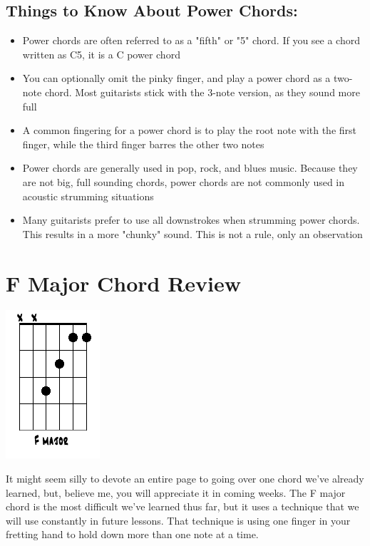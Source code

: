 \subsection{Things to Know About Power Chords:}
\begin{itemize}
\item Power chords are often referred to as a "fifth" or "5" chord. If you see
      a chord written as C5, it is a C power chord
\item You can optionally omit the pinky finger, and play a power chord as a
      two-note chord. Most guitarists stick with the 3-note version, as they sound
      more full
\item A common fingering for a power chord is to play the root note with the
      first finger, while the third finger barres the other two notes
\item Power chords are generally used in pop, rock, and blues music. Because
      they are not big, full sounding chords, power chords are not commonly used in
      acoustic strumming situations
\item Many guitarists prefer to use all downstrokes when strumming power
      chords. This results in a more "chunky" sound. This is not a rule, only an
      observation
\end{itemize}

\section{F Major Chord Review}
\includegraphics{partfour/chord_fmajor_open.png}

It might seem silly to devote an entire page to going over one chord we've
already learned, but, believe me, you will appreciate it in coming weeks. The F
major chord is the most difficult we've learned thus far, but it uses a
technique that we will use constantly in future lessons. That technique is
using one finger in your fretting hand to hold down more than one note at a
time.

